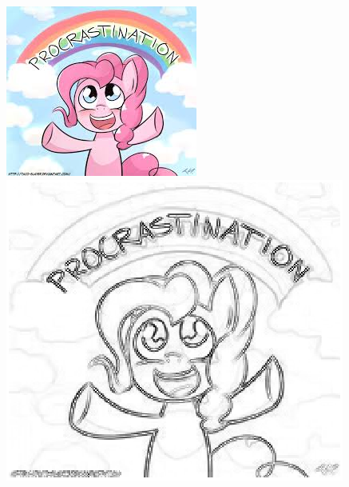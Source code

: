 \documentclass[11pt]{article}
\begin{document}
\begin{figure}[!htbp]
\centering
  \begin{minipage}[b]{0.3\textwidth}
    \includegraphics[width=\textwidth]{procrastination.png}
  \end{minipage}
   \begin{minipage}[b]{0.3\textwidth}
    \includegraphics[width=\textwidth]{sigma4_procrastination.png}
  \end{minipage}
  

\end{figure}
\end{document}

